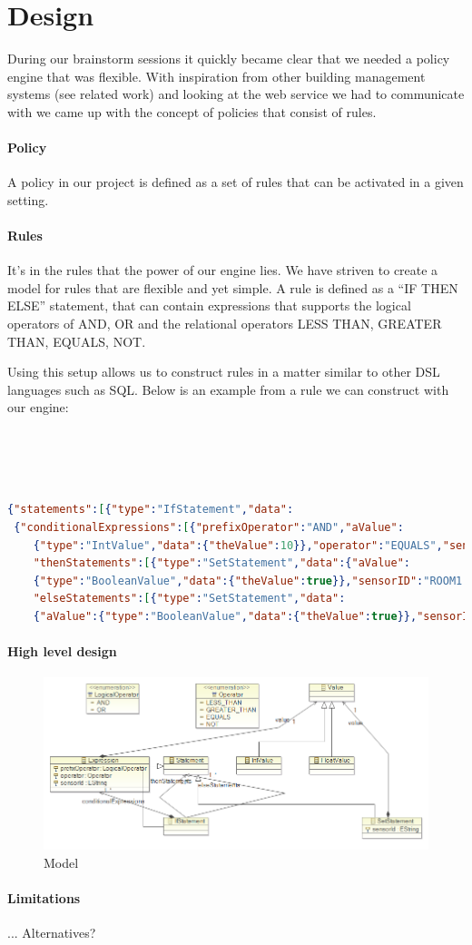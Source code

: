 \section{Design}
During our brainstorm sessions it quickly became clear that we needed a policy engine that was flexible. With inspiration from other building management systems (see related work) and looking at the web service we had to communicate with we came up with the concept of policies that consist of rules.

\paragraph{Policy}
A policy in our project is defined as a set of rules that can be activated in a given setting.

\paragraph{Rules}
It's in the rules that the power of our engine lies. We have striven to create a model for rules that are flexible and yet simple. A rule is defined as a "`IF THEN ELSE"' statement, that can contain expressions that supports the logical operators of AND, OR and the relational operators LESS THAN, GREATER THAN, EQUALS, NOT. 

Using this setup allows us to construct rules in a matter similar to other DSL languages such as SQL. Below is an example from a rule we can construct with our engine:
\\
\\
\\
\\
\\
\begin{lstlisting}[language=json,firstnumber=1]
{"statements":[{"type":"IfStatement","data":
 {"conditionalExpressions":[{"prefixOperator":"AND","aValue":
	{"type":"IntValue","data":{"theValue":10}},"operator":"EQUALS","sensorId":"ROOM1.TEMPERATURE"}],
	"thenStatements":[{"type":"SetStatement","data":{"aValue":
	{"type":"BooleanValue","data":{"theValue":true}},"sensorID":"ROOM1.HEATER"}}],
	"elseStatements":[{"type":"SetStatement","data":
	{"aValue":{"type":"BooleanValue","data":{"theValue":true}},"sensorID":"ROOM1.BLINDS"}}]}}]}
\end{lstlisting}

\paragraph{High level design}

\begin{figure}[t]
\includegraphics[width=1.00\columnwidth]{model.png}
\caption{Model}
\end{figure}


\paragraph{Limitations}
... Alternatives?
